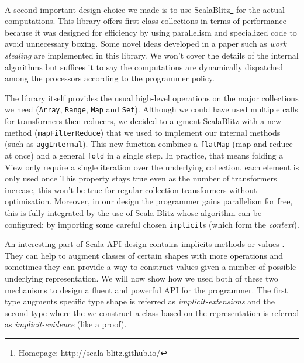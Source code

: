 \documentclass[a4paper,12pt,twocolumn]{article}
\begin{document}
A second important design choice we made is to use ScalaBlitz\footnote{Homepage: http://scala-blitz.github.io/} for the actual computations.
This library offers first-class collections in terms of performance because it was designed for efficiency by using parallelism and specialized code to avoid unnecessary boxing.
Some novel ideas developed in a paper \cite{scala-parallel} such as {\it work stealing} are implemented in this library.
We won't cover the details of the internal algorithms but suffices it to say the computations are dynamically dispatched among the processors according to the programmer policy.

The library itself provides the usual high-level operations on the major collections we need (\verb|Array|, \verb|Range|, \verb|Map| and \verb|Set|).
Although we could have used multiple calls for transformers then reducers, we decided to augment ScalaBlitz with a new method (\verb|mapFilterReduce|) that we used to implement our internal methods (such as \verb|aggInternal|).
This new function combines a \verb|flatMap| (map and reduce at once) and a general \verb|fold| in a single step.
In practice, that means folding a View only require a single iteration over the underlying collection, each element is only used once
This property stays true even as the number of transformers increase, this won't be true for regular collection transformers without optimisation.
Moreover, in our design the programmer gains parallelism for free, this is fully integrated by the use of Scala Blitz whose algorithm can be configured: by importing some careful chosen \verb|implicit|s (which form the {\it context}).

An interesting part of Scala API design contains implicits methods or values \cite{scala-implicits}.
They can help to augment classes of certain shapes with more operations and sometimes they can provide a way to construct values given a number of possible underlying representation.
We will now show how we used both of these two mechanisms to design a fluent and powerful API for the programmer.
The first type augments specific type shape is referred as {\it implicit-extensions} and the second type where the we construct a class based on the representation is referred as {\it implicit-evidence} (like a proof).
\end{document}
